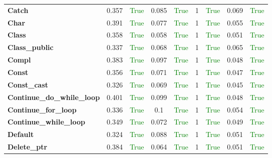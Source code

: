 \documentclass{article}
\begin{document}
\begin{xltabular}{\textwidth}{lcccccccc}
\textbf{{\fontsize{10}{12}\selectfont Catch}}& 0.357&\textcolor{green}{True}& 0.085&\textcolor{green}{True}& 1&\textcolor{green}{True}& 0.069&\textcolor{green}{True} \\[0.5ex]
\textbf{{\fontsize{10}{12}\selectfont Char}}& 0.391&\textcolor{green}{True}& 0.077&\textcolor{green}{True}& 1&\textcolor{green}{True}& 0.055&\textcolor{green}{True} \\[0.5ex]
\textbf{{\fontsize{10}{12}\selectfont Class}}& 0.358&\textcolor{green}{True}& 0.058&\textcolor{green}{True}& 1&\textcolor{green}{True}& 0.051&\textcolor{green}{True} \\[0.5ex]
\textbf{{\fontsize{10}{12}\selectfont Class\_public}}& 0.337&\textcolor{green}{True}& 0.068&\textcolor{green}{True}& 1&\textcolor{green}{True}& 0.065&\textcolor{green}{True} \\[0.5ex]
\textbf{{\fontsize{10}{12}\selectfont Compl}}& 0.383&\textcolor{green}{True}& 0.097&\textcolor{green}{True}& 1&\textcolor{green}{True}& 0.048&\textcolor{green}{True} \\[0.5ex]
\textbf{{\fontsize{10}{12}\selectfont Const}}& 0.356&\textcolor{green}{True}& 0.071&\textcolor{green}{True}& 1&\textcolor{green}{True}& 0.047&\textcolor{green}{True} \\[0.5ex]
\textbf{{\fontsize{10}{12}\selectfont Const\_cast}}& 0.326&\textcolor{green}{True}& 0.069&\textcolor{green}{True}& 1&\textcolor{green}{True}& 0.045&\textcolor{green}{True} \\[0.5ex]
\textbf{{\fontsize{10}{12}\selectfont Continue\_do\_while\_loop}}& 0.401&\textcolor{green}{True}& 0.099&\textcolor{green}{True}& 1&\textcolor{green}{True}& 0.048&\textcolor{green}{True} \\[0.5ex]
\textbf{{\fontsize{10}{12}\selectfont Continue\_for\_loop}}& 0.336&\textcolor{green}{True}& 0.1&\textcolor{green}{True}& 1&\textcolor{green}{True}& 0.054&\textcolor{green}{True} \\[0.5ex]
\textbf{{\fontsize{10}{12}\selectfont Continue\_while\_loop}}& 0.349&\textcolor{green}{True}& 0.072&\textcolor{green}{True}& 1&\textcolor{green}{True}& 0.049&\textcolor{green}{True} \\[0.5ex]
\textbf{{\fontsize{10}{12}\selectfont Default}}& 0.324&\textcolor{green}{True}& 0.088&\textcolor{green}{True}& 1&\textcolor{green}{True}& 0.051&\textcolor{green}{True} \\[0.5ex]
\textbf{{\fontsize{10}{12}\selectfont Delete\_ptr}}& 0.384&\textcolor{green}{True}& 0.064&\textcolor{green}{True}& 1&\textcolor{green}{True}& 0.051&\textcolor{green}{True} \\[0.5ex]

\end{xltabular}
\end{document}
